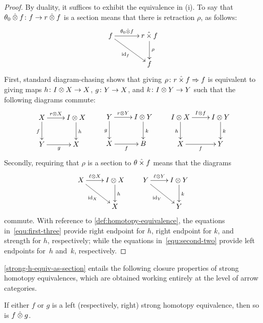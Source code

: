 \documentclass[reqno,10pt,a4paper,oneside]{amsart}
\begin{document}
\begin{proof}
By duality, it suffices to exhibit the equivalence in (i). To say that $\theta_{0} \mathbin{\hat{\otimes}} f \colon f \to r \mathbin{\hat{\otimes}} f$ is a section means that
there is retraction $\rho$, as follows:
\[
\xymatrix@C+1em{
  f
  \ar[r]^-{\thetal \hatotimes f}
  \ar[dr]_{\id_f} &   \intervalr \hattimes f \ar[d]^{\rho} \\
&   f
}
\]
First, standard diagram-chasing shows that giving $\rho \colon r \mathbin{\hat{\times}} f \Rightarrow f$ is equivalent  to giving maps $h \colon I \otimes X \to X$, $g \colon Y \to X$, and $k \colon I \otimes Y \to Y$ such that the following diagrams commute:
\begin{equation}
\label{equ:first-three}
\xycenter{
X \ar[r]^-{\intervalr \otimes X}  \ar[d]_f & \interval \otimes X \ar[d]^{h} \\
Y \ar[r]_{g} & X}  \qquad
\xycenter{
Y \ar[r]^-{\intervalr \otimes Y} \ar[d]_g & \interval \otimes Y \ar[d]^{k} \\
X \ar[r]_f & B} \qquad
\xycenter{ 
\interval \otimes X \ar[d]_h \ar[r]^{I \otimes f} & \interval \otimes Y \ar[d]^k \\
X \ar[r]_{f} & Y }
\end{equation}
Secondly, requiring that $\rho$ is a section to $\theta \mathbin{\hat{\times}} f$ means that the diagrams
\begin{equation}
\label{equ:second-two}
\xycenter{
X \ar[r]^-{\intervall \otimes X} \ar[dr]_{\id_X} & \interval \otimes X \ar[d]^h \\ 
 & X } \qquad
 \xycenter{
 Y \ar[r]^-{\intervall \otimes Y}  \ar[dr]_{\id_Y} & \interval \otimes Y \ar[d]^{k} \\
  & Y} 
\end{equation}
commute. With reference to \cref{def:homotopy-equivalence}, the equations in~\eqref{equ:first-three} provide right endpoint for $h$, 
right endpoint for $k$, and strength for $h$, respectively; while the equations in~\eqref{equ:second-two} provide left endpoints for~$h$ and~$k$, respectively.
\end{proof}

\cref{strong-h-equiv-as-section} entails the following closure properties of strong homotopy equivalences, which are obtained working entirely at the level of arrow categories.

\begin{proposition}
\label{strong-h-equiv-closed-under-monoidal-prod}
If either $f$ or $g$ is a left (respectively, right) strong homotopy equivalence, then so is $f \mathbin{\hat{\otimes}} g$.
\end{proposition}
\end{document}
